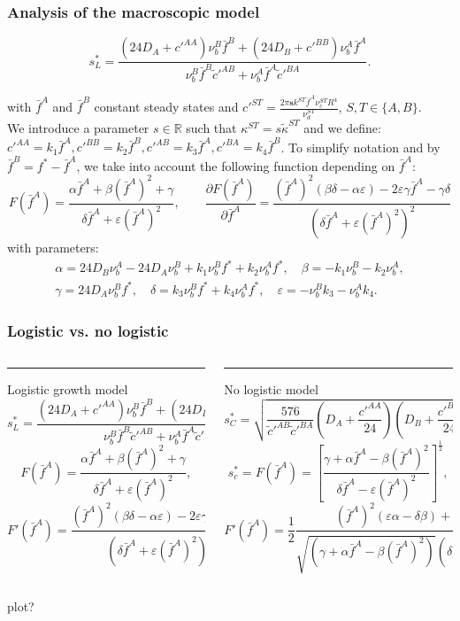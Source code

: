 \documentclass[10pt]{beamer}
\newcommand\eps{\varepsilon}
\newcommand\ka{\kappa}
\def \p {{\partial}}
\def \a {{\alpha}}
\def \b {{\beta}}
\def \g {{\gamma}}
\def \d {{\delta}}
\def \bfA {{\bar{f}^A}}
\def \bfB {{\bar{f}^B}}
\newcommand\Fontv{\fontsize{7}{7.2}\selectfont}
\newcommand\Fontvii{\fontsize{9}{7.2}\selectfont}
\begin{document}
\begin{frame}
\frametitle{Analysis of the macroscopic model}
\Fontvii
$$s_{L}^{*}=\frac{(24 D_A+c'^{AA})\nu_{b}^{B}\bar{f}^{B}+(24 D_B+c'^{BB})\nu_{b}^{A}\bar{f}^A}{\nu_{b}^{B}\bar{f}^B\tilde{c}'^{AB}+\nu_{b}^{A}\bar{f}^A\tilde{c}'^{BA}}. $$

with $\bar{f}^A$ and $\bar{f}^B$ constant steady states and 
$c'^{ST}=\frac{2\pi \textbf{s} k^{ST} \bfA \nu_c^{ST} R^{4}}{\nu_d^{ST}}$, $S,T \in \{ A,B \}$. \\
We introduce a parameter $s\in \mathbb{R}$ such that $\ka^{ST}=s\tilde{\ka}^{ST} $
and we define: $c'^{AA}=k_1 \bfA, c'^{BB}=k_2\bfB, c'^{AB}=k_3\bfA, c'^{BA}=k_4\bfB$.
To simplify notation and by $\bar{f}^B=f^*-\bar{f}^A$, we take into account the following function depending on $\bfA$:
$$F(\bfA)=\frac{\a \bfA + \b (\bfA)^2 + \g}{\d \bfA + \eps(\bfA)^2}, \quad\quad 
\frac{\p F(\bfA)}{\p \bfA}=\frac{(\bfA)^2(\b \d-\a \eps)-2\eps \g \bfA - \g\d}{(\d \bfA+\eps (\bfA)^2)^2}$$ 
with parameters:
\begin{align}
\a= 24D_B \nu_b^A -24 D_A \nu_b^B +k_1 \nu_b^B f^* + k_2 \nu_b^A f^*, \quad
\b=-k_1 \nu_b^B -k_2 \nu_b^A, \\
\g= 24 D_A \nu_b^B f^*, \quad 
\d= k_3\nu_b^B f^*+k_4 \nu_b^A f^*, \quad
\eps= -\nu_b^B k_3-	\nu_b^A k_4.
\end{align}
\end{frame}




\begin{frame}
\frametitle{Logistic vs. no logistic}
\Fontv
\begin{columns}[T] %
	\begin{column}{.50\textwidth}
		\color{orange}\rule{\linewidth}{2pt}
		Logistic growth model
		$$s_{L}^{*}=\frac{(24 D_A+c'^{AA})\nu_{b}^{B}\bar{f}^{B}+(24 D_B+c'^{BB})\nu_{b}^{A}\bar{f}^A}{\nu_{b}^{B}\bar{f}^B\tilde{c}'^{AB}+\nu_{b}^{A}\bar{f}^A\tilde{c}'^{BA}}, $$
		$$F(\bfA)=\frac{\a \bfA + \b (\bfA)^2 + \g}{\d \bfA + \eps(\bfA)^2}, $$
		$$F'(\bfA)=\frac{(\bfA)^2(\b \d-\a \eps)-2\eps \g \bfA - \g\d}{(\d \bfA+\eps (\bfA)^2)^2}$$ 
		
		
	\end{column}%
	\hfill%
	\begin{column}{.50\textwidth}
		\color{blue}\rule{\linewidth}{2pt}
		No logistic model
		$$ s^{*}_{C}= \sqrt{\frac{576}{\tilde{c}'^{AB} \tilde{c}'^{BA}} \left( D_A+\frac{c'^{AA}}{24} \right) \left(D_B+\frac{c'^{BB}}{24} \right) } $$
		$$ s^{*}_c=F(\bfA)=\left[\frac{\g +\a \bfA - \b (\bfA)^2}{\d \bfA-\eps(\bfA)^2} \right]^{\frac{1}{2}},  $$
		$$  F'(\bfA)=\frac{1}{2} \frac{(\bfA)^{2}(\eps \a-\d\b)+2\eps\g\bfA-\d\g}{\sqrt{(\g+\a \bfA-\b(\bfA)^2)} (\d\bfA-\eps(\bfA)^2)^{3/2} }$$
		
	\end{column}%
\end{columns}

plot?
\end{frame}
\end{document}
